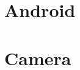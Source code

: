 \documentclass[11pt,a4paper,english,twoside,openright,oldfontcommands,final]{memoir}
\begin{document}


\tableofcontents




\part{Android}
\label{chap:android}






\part{Camera}





%
%

\appendix
%


\printbibliography
\end{document}
